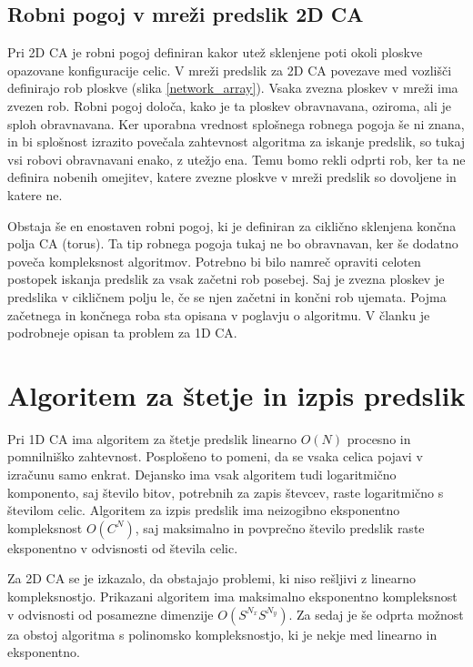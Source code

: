 \documentclass[12pt,a4paper,openany,twoside]{book}
\begin{document}
\section{Robni pogoj v mreži predslik 2D CA} 

Pri 2D CA je robni pogoj definiran kakor utež sklenjene poti okoli ploskve opazovane konfiguracije celic.
V mreži predslik za 2D CA povezave med vozlišči definirajo rob ploskve (slika \ref{network_array}).
Vsaka zvezna ploskev v mreži ima zvezen rob. Robni pogoj določa, kako je ta ploskev obravnavana,
oziroma, ali je sploh obravnavana.
Ker uporabna vrednost splošnega robnega pogoja še ni znana,
in bi splošnost izrazito povečala zahtevnost algoritma za iskanje predslik,
so tukaj vsi robovi obravnavani enako, z utežjo ena. Temu bomo rekli odprti rob,
ker ta ne definira nobenih omejitev, katere zvezne ploskve v mreži predslik
so dovoljene in katere ne.

Obstaja še en enostaven robni pogoj, ki je definiran za ciklično sklenjena končna polja CA (torus).
Ta tip robnega pogoja tukaj ne bo obravnavan, ker še dodatno poveča kompleksnost algoritmov.
Potrebno bi bilo namreč opraviti celoten postopek iskanja predslik za vsak začetni rob posebej.
Saj je zvezna ploskev je predslika v cikličnem polju le, če se njen začetni in končni rob ujemata.
Pojma začetnega in končnega roba sta opisana v poglavju o algoritmu.
V članku \cite{JerasDobnikar2007} je podrobneje opisan ta problem za 1D CA.




\chapter{Algoritem za štetje in izpis predslik}

Pri 1D CA ima algoritem za štetje predslik linearno \(O(N)\) procesno in pomnilniško zahtevnost.
Posplošeno to pomeni, da se vsaka celica pojavi v izračunu samo enkrat.
Dejansko ima vsak algoritem tudi logaritmično komponento,
saj število bitov, potrebnih za zapis števcev, raste logaritmično s številom celic.
Algoritem za izpis predslik ima neizogibno eksponentno kompleksnost \(O(C^N)\),
saj maksimalno in povprečno število predslik raste eksponentno
v odvisnosti od števila celic.

Za 2D CA se je izkazalo, da obstajajo problemi, ki niso rešljivi z linearno kompleksnostjo.
Prikazani algoritem ima maksimalno eksponentno kompleksnost
v odvisnosti od posamezne dimenzije \(O(S^{N_x} S^{N_y})\).
Za sedaj je še odprta možnost za obstoj algoritma s polinomsko kompleksnostjo,
ki je nekje med linearno in eksponentno.
\end{document}
